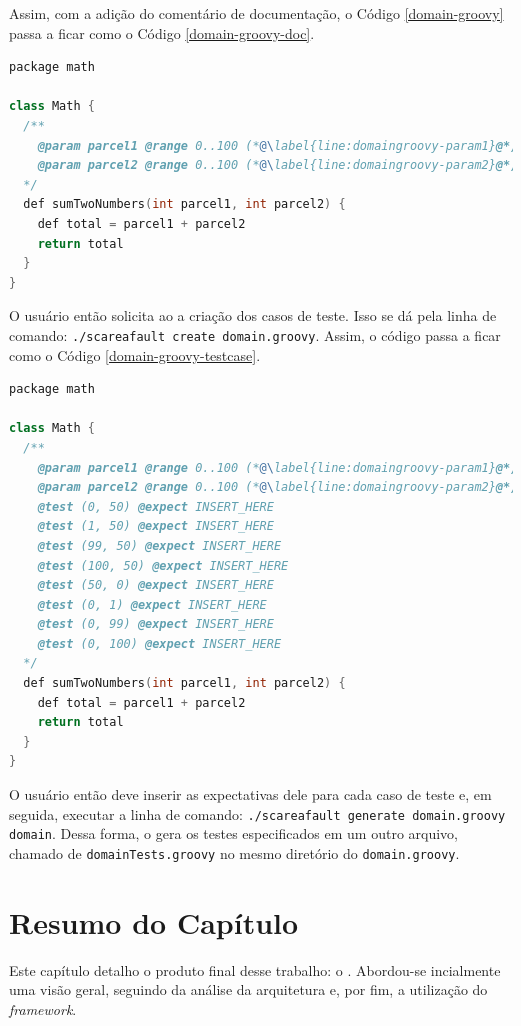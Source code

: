 Assim, com a adição do comentário de documentação, o Código \ref{domain-groovy}
passa a ficar como o Código \ref{domain-groovy-doc}.
\begin{lstlisting}[language=C++, label=domain-groovy-doc, caption=Código do arquivo domain.groovy com as marcações do \scarefault]
package math

class Math {
  /**
    @param parcel1 @range 0..100 (*@\label{line:domaingroovy-param1}@*)
    @param parcel2 @range 0..100 (*@\label{line:domaingroovy-param2}@*)
  */
  def sumTwoNumbers(int parcel1, int parcel2) {
    def total = parcel1 + parcel2
    return total
  }
}
\end{lstlisting}

O usuário então solicita ao \scarefault a criação dos casos de teste.
Isso se dá pela linha de comando:
\lstinline|./scareafault create domain.groovy|. Assim,
o código passa a ficar como o Código \ref{domain-groovy-testcase}.
\begin{lstlisting}[language=C++, label=domain-groovy-testcase, caption=Código do arquivo domain.groovy com os casos de teste]
package math

class Math {
  /**
    @param parcel1 @range 0..100 (*@\label{line:domaingroovy-param1}@*)
    @param parcel2 @range 0..100 (*@\label{line:domaingroovy-param2}@*)
    @test (0, 50) @expect INSERT_HERE
    @test (1, 50) @expect INSERT_HERE
    @test (99, 50) @expect INSERT_HERE
    @test (100, 50) @expect INSERT_HERE
    @test (50, 0) @expect INSERT_HERE
    @test (0, 1) @expect INSERT_HERE
    @test (0, 99) @expect INSERT_HERE
    @test (0, 100) @expect INSERT_HERE
  */
  def sumTwoNumbers(int parcel1, int parcel2) {
    def total = parcel1 + parcel2
    return total
  }
}
\end{lstlisting}

O usuário então deve inserir as expectativas dele para cada caso
de teste e, em seguida, executar a linha de comando:
\lstinline|./scareafault generate domain.groovy domain|.
Dessa forma, o \scarefault gera os testes especificados em um outro
arquivo, chamado de \lstinline|domainTests.groovy| no mesmo diretório
do \lstinline|domain.groovy|.

\section{Resumo do Capítulo}
  Este capítulo detalho o produto final desse trabalho: o \scarefault. Abordou-se incialmente uma visão geral, seguindo da análise da arquitetura e, por fim, a utilização do \textit{framework}.
